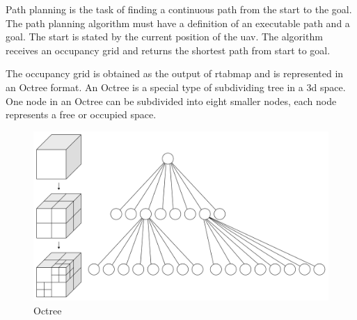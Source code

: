 Path planning is the task of finding a continuous path from the start to the goal. The path planning algorithm must have a definition of an executable path and a goal. The start is stated by the current position of the \acs{uav}. The algorithm receives an occupancy grid and returns the shortest path from start to goal. \cite{KLANCAR2017161}

The occupancy grid is obtained as the output of \acs{rtabmap} and is represented in an Octree format. An Octree is a special type of subdividing tree in a \acs{3d} space. One node in an Octree can be subdivided into eight smaller nodes, each node represents a free or occupied space. \cite{octrees_gamedev}

\begin{figure}[!h]
  \centering
  \includegraphics[width=0.6\linewidth]{images/octree.png}
  \caption{Octree \cite{octrees_gamedev}}
\end{figure}